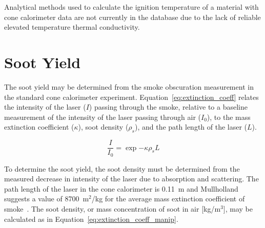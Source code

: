 \documentclass[12pt,oneside]{book}
\begin{document}
Analytical methods used to calculate the ignition temperature of a material with cone calorimeter data are not currently in the database due to the lack of reliable elevated temperature thermal conductivity.


\section{Soot Yield}

The soot yield may be determined from the smoke obscuration measurement in the standard cone calorimeter experiment. Equation~\ref{eq:extinction_coeff} relates the intensity of the laser ($I$) passing through the smoke, relative to a baseline measurement of the intensity of the laser passing through air ($I_0$), to the mass extinction coefficient ($\kappa$), soot density ($\rho_s$), and the path length of the laser ($L$). 

\begin{equation}
\frac{I}{I_0} = \exp{-\kappa\rho_sL}  \label{eq:extinction_coeff}
\end{equation}

To determine the soot yield, the soot density must be determined from the measured decrease in intensity of the laser due to absorption and scattering. The path length of the laser in the cone calorimeter is 0.11~m and Mullholland suggests a value of 8700~m$^2$/kg for the average mass extinction coefficient of smoke~\cite{Mullholland}. The soot density, or mass concentration of soot in air [kg/m$^3$], may be calculated as in Equation~\ref{eq:extinction_coeff_manip}. 
\end{document}

